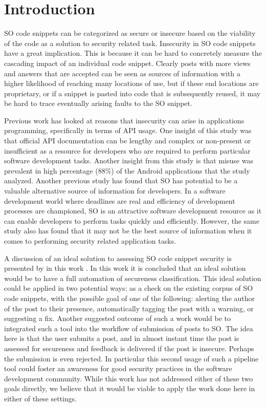 \documentclass[10pt, conference]{IEEEtran}
\begin{document}
\section{Introduction}
SO code snippets can be categorized as secure or insecure based on the viability of the code as a solution to security related task. Insecurity in SO code snippets have a great implication. This is because it can be hard to concretely measure the cascading impact of an individual code snippet. 
Clearly posts with more views and answers that are accepted can be seen as sources of information with a higher likelihood of reaching many locations of use, but if  these end locations are proprietary, or if a snippet is pasted into code that is subsequently reused, it may be hard to trace eventually arising faults to the SO snippet.

Previous work \cite{Egele:2013:ESC:2508859.2516693} has looked at reasons that insecurity can arise in applications programming, specifically in terms of API usage. One insight of this study was that official API documentation can be lengthy and complex or non-present or insufficient as a resource for developers who are required to perform particular software development tasks. Another insight from this study is that misuse was prevalent in high percentage (88\%) of the Android applications that the study analyzed. Another previous study \cite{7546508} has found that SO has potential to be a valuable alternative source of information for developers. In a software development world where deadlines are real and efficiency of development processes are championed, SO is an attractive software development resource as it can enable developers to perform tasks quickly and efficiently. However, the same study also has found that it may not be the best source of information when it comes to performing security related application tasks.


A discussion of an ideal solution to assessing SO code snippet security is presented by in this work \cite{DBLP:journals/corr/abs-1901-01327}. In this work it is concluded that an ideal solution would be to have a full automation of secureness classification. This ideal solution could be applied in two potential ways: as a check on the existing corpus of SO code snippets, with the possible goal of one of the following: alerting the author of the post to their presence, automatically tagging the post with a warning, or suggesting a fix. Another suggested outcome of such a work would be to integrated such a tool into the workflow of submission of posts to SO. The idea here is that the user submits a post, and in almost instant time the post is assessed for secureness and feedback is delivered if the post is insecure. Perhaps the submission is even rejected. In particular this second usage of such a pipeline tool could foster an awareness for good security practices in the software development community. While this work has not addressed either of these two goals directly, we believe that it would be viable to apply the work done here in either of these settings.
\end{document}
